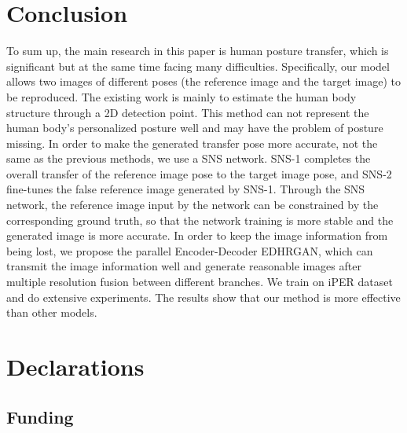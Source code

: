 \section{Conclusion}
To sum up, the main research in this paper is human posture transfer, which is significant but at the same time facing many difficulties. Specifically, our model allows two images of different poses (the reference image and the target image) to be reproduced. The existing work is mainly to estimate the human body structure through a 2D detection point. This method can not represent the human body's personalized posture well and may have the problem of posture missing. In order to make the generated transfer pose more accurate, not the same as the previous methods, we use a SNS network. SNS-1 completes the overall transfer of the reference image pose to the target image pose, and SNS-2 fine-tunes the false reference image generated by SNS-1. Through the SNS network, the reference image input by the network can be constrained by the corresponding ground truth, so that the network training is more stable and the generated image is more accurate. In order to keep the image information from being lost, we propose the parallel Encoder-Decoder EDHRGAN, which can transmit the image information well and generate reasonable images after multiple resolution fusion between different branches. We train on iPER dataset and do extensive experiments. The results show that our method is more effective than other models.
	
	
	
	
	
\section*{Declarations}
\subsection*{Funding}
	
	

